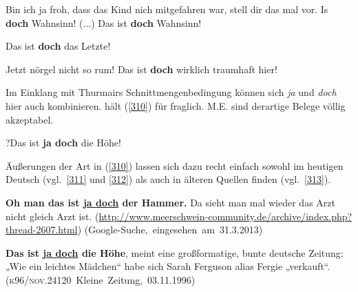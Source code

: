 \begin{exe}
	\ex\label{307} 
	Bin ich ja froh, dass das Kind nich mitgefahren war, stell dir das mal vor. Is \textbf{doch} Wahnsinn! (...) Das ist \textbf{doch} Wahnsinn!
\end{exe}
	
\begin{exe}
	\ex\label{308} 
	Das ist \textbf{doch} das Letzte!
\end{exe}	

\begin{exe}
	\ex\label{309} 
	Jetzt nörgel nicht so rum! Das ist \textbf{doch} wirklich traumhaft hier!
	\newline
	\hbox{}\hfill\hbox{\citet[114--115]{Thurmair1989}}	
\end{exe}
Im Einklang mit Thurmairs Schnittmengenbedingung können sich \textit{ja} und \textit{doch} hier auch kombinieren. \citet[235]{Rinas2006} hält (\ref{310}) für fraglich. M.E. sind derartige Belege völlig akzeptabel.

\begin{exe}
	\ex\label{310} 
	?Das ist \textbf{ja doch} die Höhe!	
\end{exe}
Äußerungen der Art in (\ref{310}) lassen sich dazu recht einfach sowohl im heutigen Deutsch (vgl.\ \ref{311} und \ref{312}) als auch in älteren Quellen finden (vgl.\ \ref{313}).
\begin{exe}
	\ex\label{311} 

	\textbf{Oh man das ist \underline{ja doch} der Hammer.} Da sieht man mal wieder das Arzt nicht gleich Arzt ist. 
	\newline
	{\scriptsize(\url{http://www.meerschwein-community.de/archive/index.php?thread-2607.html})	}
	\newline
	\hbox{}\hfill\hbox{(Google-Suche, eingesehen am 31.3.2013)}	
\end{exe}
	      
\begin{exe}
	\ex\label{312} 

	\textbf{Das ist \underline{ja doch} die Höhe}, meint eine großformatige, bunte deutsche Zeitung: „Wie ein leichtes Mädchen“ habe sich Sarah 	Ferguson alias Fergie „verkauft“. 
	\hfill\hbox{(\textsc{k96/nov.24120} Kleine Zeitung, 03.11.1996)}	
\end{exe}
	
